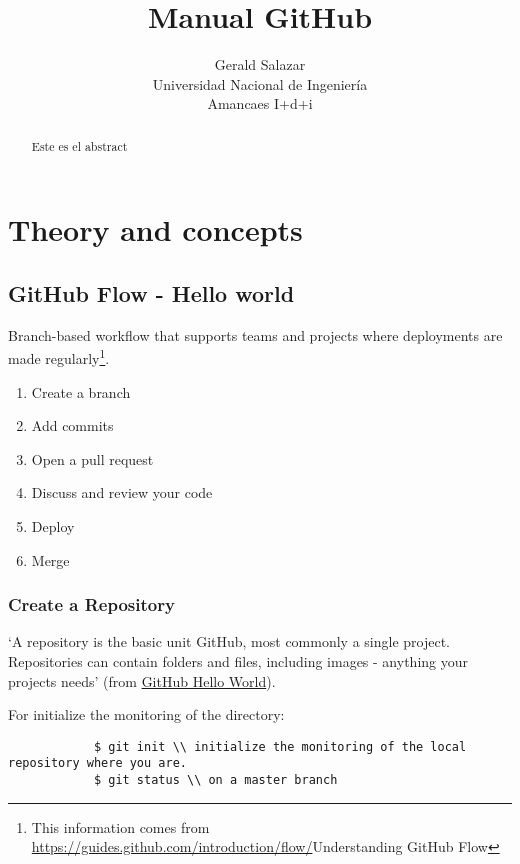 \documentclass[12pt]{article}
\title{Manual GitHub}
\author{Gerald Salazar \\
Universidad Nacional de Ingeniería \\
Amancaes I+d+i}
\begin{document}
\maketitle
\tableofcontents
\newpage


\begin{abstract}
Este es el abstract
\end{abstract}

\chapter{Theory and concepts}

 	\section{GitHub Flow - Hello world}

		Branch-based workflow that supports teams and projects where deployments are made regularly\footnote{This information comes from \url{https://guides.github.com/introduction/flow/}{Understanding GitHub Flow}}. 

		\begin{enumerate}
		\item Create a branch 
		\item Add commits 
		\item Open a pull request 
		\item Discuss and review your code
		\item Deploy 
		\item Merge
		\end{enumerate}

	\subsection{Create a Repository}

		`A repository is the basic unit GitHub, most commonly a single project. Repositories can contain folders and files, including images - anything your projects needs' (from \href{https://guides.github.com/activities/hello-world/}{GitHub Hello World}). 

		For initialize the monitoring of the directory: 

			\begin{verbatim}
			$ git init \\ initialize the monitoring of the local repository where you are.
			$ git status \\ on a master branch
			\end{verbatim}
\end{document}
